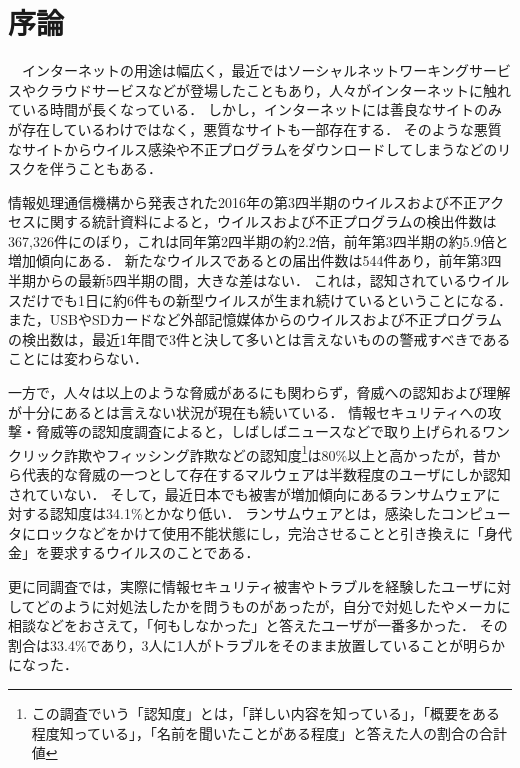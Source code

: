 \chapter{序論}

　インターネットの用途は幅広く，最近ではソーシャルネットワーキングサービスやクラウドサービスなどが登場したこともあり，人々がインターネットに触れている時間が長くなっている．
しかし，インターネットには善良なサイトのみが存在しているわけではなく，悪質なサイトも一部存在する．
そのような悪質なサイトからウイルス感染や不正プログラムをダウンロードしてしまうなどのリスクを伴うこともある．

情報処理通信機構から発表された2016年の第3四半期のウイルスおよび不正アクセスに関する統計資料によると，ウイルスおよび不正プログラムの検出件数は367,326件にのぼり，これは同年第2四半期の約2.2倍，前年第3四半期の約5.9倍と増加傾向にある\cite{joron2}．
新たなウイルスであるとの届出件数は544件あり，前年第3四半期からの最新5四半期の間，大きな差はない．
これは，認知されているウイルスだけでも1日に約6件もの新型ウイルスが生まれ続けているということになる．
また，USBやSDカードなど外部記憶媒体からのウイルスおよび不正プログラムの検出数は，最近1年間で3件と決して多いとは言えないものの警戒すべきであることには変わらない．

一方で，人々は以上のような脅威があるにも関わらず，脅威への認知および理解が十分にあるとは言えない状況が現在も続いている．
情報セキュリティへの攻撃・脅威等の認知度調査\cite{joron1}によると，しばしばニュースなどで取り上げられるワンクリック詐欺やフィッシング詐欺などの認知度\footnote{この調査でいう「認知度」とは，「詳しい内容を知っている」，「概要をある程度知っている」，「名前を聞いたことがある程度」と答えた人の割合の合計値}は80\%以上と高かったが，昔から代表的な脅威の一つとして存在するマルウェアは半数程度のユーザにしか認知されていない．
そして，最近日本でも被害が増加傾向にあるランサムウェア\cite{ransomware}に対する認知度は34.1\%とかなり低い．
ランサムウェアとは，感染したコンピュータにロックなどをかけて使用不能状態にし，完治させることと引き換えに「身代金」を要求するウイルスのことである．

更に同調査では，実際に情報セキュリティ被害やトラブルを経験したユーザに対してどのように対処法したかを問うものがあったが，自分で対処したやメーカに相談などをおさえて，「何もしなかった」と答えたユーザが一番多かった．
その割合は33.4\%であり，3人に1人がトラブルをそのまま放置していることが明らかになった\cite{joron1}．

